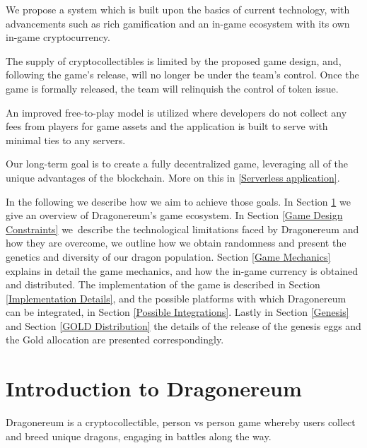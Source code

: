 \documentclass[12pt]{article}
\begin{document}
We propose a system which is built upon the basics of current technology, with advancements such as rich gamification and an in-game ecosystem with its own in-game cryptocurrency.\par

The supply of cryptocollectibles is limited by the proposed game design, and, following the game’s release, will no longer be under the team’s control. Once the game is formally released, the team will relinquish the control of token issue.\par

An improved free-to-play model is utilized where developers do not collect any fees from players for game assets and the application is built to serve with minimal ties to any servers.\par

Our long-term goal is to create a fully decentralized game, leveraging all of the unique advantages of the blockchain. More on this in \ref{Serverless application}.\par

In the following we describe how we aim to achieve those goals. In Section \ref{Introduction to Dragonereum} we give an overview of Dragonereum’s game ecosystem. In Section \ref{Game Design Constraints} we\ describe the technological limitations faced by Dragonereum and how they are overcome, we outline how we obtain randomness and present the genetics and diversity of our dragon population.  Section \ref{Game Mechanics} explains in detail the game mechanics, and how the in-game currency is obtained and distributed. The implementation of the game is described in Section \ref{Implementation Details}, and the possible platforms with which Dragonereum can be integrated, in Section \ref{Possible Integrations}. Lastly in Section \ref{Genesis} and Section \ref{GOLD Distribution} the details of the release of the genesis eggs and the Gold allocation are presented correspondingly.\par


\newpage
\vspace{\baselineskip}\section{Introduction to Dragonereum}
  \label{Introduction to Dragonereum}  \par

Dragonereum is a cryptocollectible, person vs person game whereby users collect and breed unique dragons, engaging in battles along the way.\par
\end{document}
